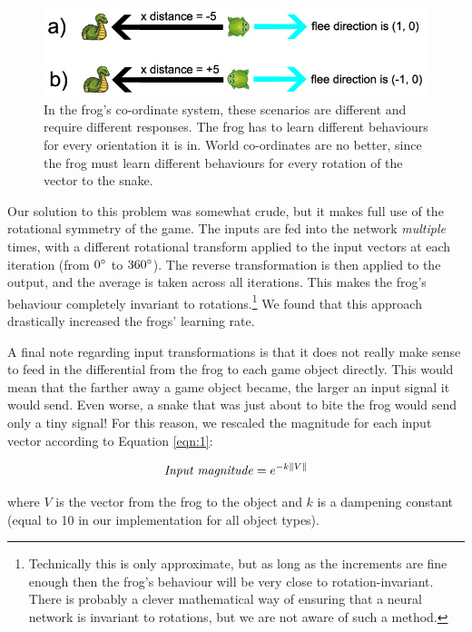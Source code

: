 \begin{figure}[!htbp]
    \centering
    \includegraphics[scale=0.6]{Figs/NormalisationProblem.png}
    \caption{In the frog's co-ordinate system, these scenarios are different and require different responses. The frog has to learn different behaviours for every orientation it is in. World co-ordinates are no better, since the frog must learn different behaviours for every rotation of the vector to the snake.}
    \label{fig:NormalisationProblem}
\end{figure}

Our solution to this problem was somewhat crude, but it makes full use of the rotational symmetry of the game. The inputs are fed into the network \textit{multiple} times, with a different rotational transform applied to the input vectors at each iteration (from $0\degree$ to $360\degree$). The reverse transformation is then applied to the output, and the average is taken across all iterations. This makes the frog's behaviour completely invariant to rotations.\footnote{Technically this is only approximate, but as long as the increments are fine enough then the frog's behaviour will be very close to rotation-invariant. There is probably a clever mathematical way of ensuring that a neural network is invariant to rotations, but we are not aware of such a method.} We found that this approach drastically increased the frogs' learning rate.

A final note regarding input transformations is that it does not really make sense to feed in the differential from the frog to each game object directly. This would mean that the farther away a game object became, the larger an input signal it would send. Even worse, a snake that was just about to bite the frog would send only a tiny signal! For this reason, we rescaled the magnitude for each input vector according to Equation \ref{eqn:1}:

\begin{align}
\text{\textit{Input magnitude}} = e^{-k\|V\|}
\label{eqn:1}
\end{align}

where $V$ is the vector from the frog to the object and $k$ is a dampening constant (equal to 10 in our implementation for all object types).

